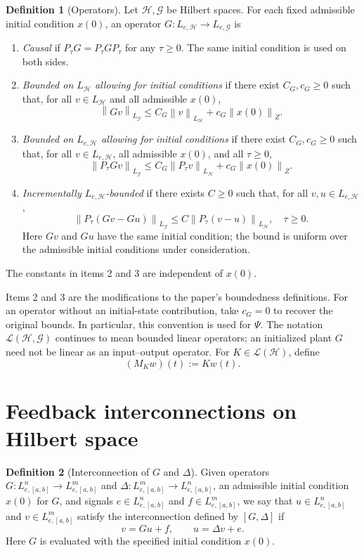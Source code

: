 \documentclass[10pt,twocolumn,letterpaper]{article}
\theoremstyle{definition}
\newtheorem{definition}{Definition}
\theoremstyle{plain}
\newcommand{\norm}[1]{\left\lVert #1\right\rVert}
\begin{document}
\begin{definition}[Operators]
Let $\mathcal H,\mathcal G$ be Hilbert spaces. For each fixed admissible
initial condition $x(0)$, an operator
$G:L_{e,\mathcal H}\to L_{e,\mathcal G}$ is
\begin{enumerate}
\item \emph{Causal} if $P_\tau G=P_\tau GP_\tau$ for any $\tau\geq0$.
The same initial condition is used on both sides.
\item \emph{Bounded on $L_{\mathcal H}$ allowing for initial conditions}
if there exist $C_G,c_G\geq0$ such that, for all $v\in L_{\mathcal H}$
and all admissible $x(0)$,
\[
 \norm{Gv}_{L_{\mathcal G}}
 \leq C_G\norm{v}_{L_{\mathcal H}}+c_G\norm{x(0)}_Z.
\]
\item \emph{Bounded on $L_{e,\mathcal H}$ allowing for initial conditions}
if there exist $C_G,c_G\geq0$ such that, for all
$v\in L_{e,\mathcal H}$, all admissible $x(0)$, and all $\tau\geq0$,
\[
 \norm{P_\tau Gv}_{L_{\mathcal G}}
 \leq C_G\norm{P_\tau v}_{L_{\mathcal H}}+c_G\norm{x(0)}_Z.
\]
\item \emph{Incrementally $L_{e,\mathcal H}$-bounded} if there exists
$C\geq0$ such that, for all $v,u\in L_{e,\mathcal H}$,
\[
 \norm{P_\tau(Gv-Gu)}_{L_{\mathcal G}}
 \leq C\norm{P_\tau(v-u)}_{L_{\mathcal H}},\quad \tau\geq0.
\]
Here $Gv$ and $Gu$ have the same initial condition; the bound is uniform
over the admissible initial conditions under consideration.
\end{enumerate}
The constants in items 2 and 3 are independent of $x(0)$.
\end{definition}

Items 2 and 3 are the modifications to the paper's boundedness
definitions. For an operator without an initial-state contribution,
take $c_G=0$ to recover the original bounds. In particular, this
convention is used for $\Psi$. The notation $\mathcal L(\mathcal H,\mathcal G)$
continues to mean bounded linear operators; an initialized plant $G$
need not be linear as an input--output operator. For
$K\in\mathcal L(\mathcal H)$, define
\[
 (M_Kw)(t):=Kw(t).
\]

\section*{Feedback interconnections on Hilbert space}

\begin{definition}[Interconnection of $G$ and $\Delta$]
Given operators $G:L^n_{e,[a,b]}\to L^m_{e,[a,b]}$ and
$\Delta:L^m_{e,[a,b]}\to L^n_{e,[a,b]}$, an admissible initial condition
$x(0)$ for $G$, and signals $e\in L^n_{e,[a,b]}$ and
$f\in L^m_{e,[a,b]}$, we say that $u\in L^n_{e,[a,b]}$ and
$v\in L^m_{e,[a,b]}$ satisfy the interconnection defined by $[G,\Delta]$ if
\begin{equation}\label{eq:one}
 v=Gu+f,\qquad u=\Delta v+e.
\end{equation}
Here $G$ is evaluated with the specified initial condition $x(0)$.
\end{definition}
\end{document}
